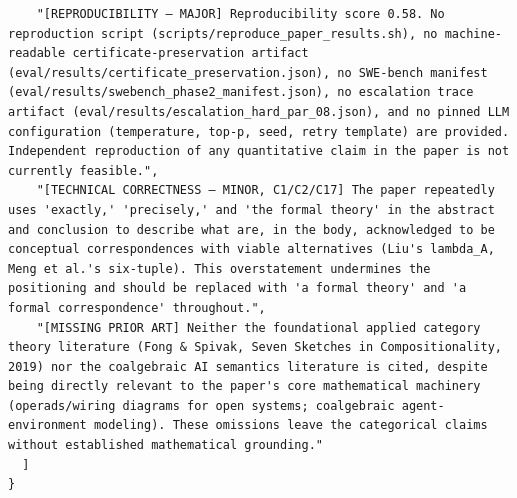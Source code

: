 \documentclass[11pt]{article}
\begin{document}
\begin{verbatim}
    "[REPRODUCIBILITY — MAJOR] Reproducibility score 0.58. No reproduction script (scripts/reproduce_paper_results.sh), no machine-readable certificate-preservation artifact (eval/results/certificate_preservation.json), no SWE-bench manifest (eval/results/swebench_phase2_manifest.json), no escalation trace artifact (eval/results/escalation_hard_par_08.json), and no pinned LLM configuration (temperature, top-p, seed, retry template) are provided. Independent reproduction of any quantitative claim in the paper is not currently feasible.",
    "[TECHNICAL CORRECTNESS — MINOR, C1/C2/C17] The paper repeatedly uses 'exactly,' 'precisely,' and 'the formal theory' in the abstract and conclusion to describe what are, in the body, acknowledged to be conceptual correspondences with viable alternatives (Liu's lambda_A, Meng et al.'s six-tuple). This overstatement undermines the positioning and should be replaced with 'a formal theory' and 'a formal correspondence' throughout.",
    "[MISSING PRIOR ART] Neither the foundational applied category theory literature (Fong & Spivak, Seven Sketches in Compositionality, 2019) nor the coalgebraic AI semantics literature is cited, despite being directly relevant to the paper's core mathematical machinery (operads/wiring diagrams for open systems; coalgebraic agent-environment modeling). These omissions leave the categorical claims without established mathematical grounding."
  ]
}
\end{verbatim}
\end{document}
